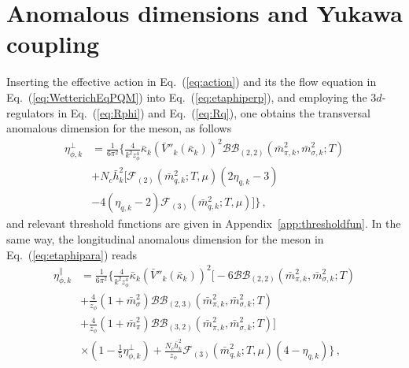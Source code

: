 \documentclass[%
reprint,
superscriptaddress,
showpacs,preprintnumbers,
 amsmath,amssymb,
 aps,
prd,
]{revtex4-1}
\def\Eq#1{Eq.~(\ref{#1})}
\def\app#1{Appendix~\ref{#1}}
\begin{document}

\appendix

\section{Anomalous dimensions and Yukawa coupling}
\label{app:anom}

Inserting the effective action in \Eq{eq:action} and its the flow equation in \Eq{eq:WetterichEqPQM} into \Eq{eq:etaphiperp}, and employing the $3d$- regulators in \Eq{eq:Rphi} and \Eq{eq:Rq}, one obtains the transversal anomalous dimension for the meson, as follows
\begin{align}
  \eta_{\phi,k}^{\perp}&=\frac{1}{6\pi^2}\Bigg\{\frac{4}{k^2 z_\phi^4} \bar{\kappa}_k(\bar{V}''_k(\bar{\kappa}_k))^2\mathcal{BB}_{(2,2)}(\bar{m}^{2}_{\pi,k},\bar{m}^{2}_{\sigma,k};T)\nonumber\\[2ex]
&+N_c\bar{h}^{2}_{k}\bigg[\mathcal{F}_{(2)}(\bar{m}^{2}_{q,k};T,\mu)(2\eta_{q,k}-3)\nonumber\\[2ex]
&-4(\eta_{q,k}-2)\mathcal{F}_{(3)}(\bar{m}^2_{q,k};T,\mu)\bigg]\Bigg\}\,, \label{eq:etaphiperp2}  
\end{align} 
and relevant threshold functions are given in \app{app:thresholdfun}. In the same way, the longitudinal anomalous dimension for the meson in \Eq{eq:etaphipara} reads
\begin{align}
  \eta_{\phi,k}^{\parallel}&=\frac{1}{6\pi^2}\Bigg\{\frac{4}{k^2 z_\phi^4}\bar{\kappa}_k(\bar{V}''_k(\bar{\kappa}_k))^2\bigg[-6\mathcal{BB}_{(2,2)}(\bar{m}^{2}_{\pi,k},\bar{m}^{2}_{\sigma,k};T)\nonumber\\[2ex]
&+\frac{4}{z_\phi}(1+\bar{m}^{2}_{\sigma}){\mathcal{BB}}_{(2,3)}(\bar{m}^{2}_{\pi,k},\bar{m}^{2}_{\sigma,k};T)\nonumber\\[2ex]
&+\frac{4}{z_\phi}(1+\bar{m}^{2}_{\pi}){\mathcal{BB}}_{(3,2)}(\bar{m}^{2}_{\pi,k},\bar{m}^{2}_{\sigma,k};T)\bigg]\nonumber\\[2ex]
&\times(1-\frac{1}{5}\eta^{\bot}_{\phi,k})+\frac{N_c\bar{h}^{2}_{k}}{z_\phi}\mathcal{F}_{(3)}(\bar{m}^{2}_{q,k};T,\mu)(4-\eta_{q,k})\bigg\}\,, \label{eq:etaphipara2}  
\end{align} 
\end{document}

